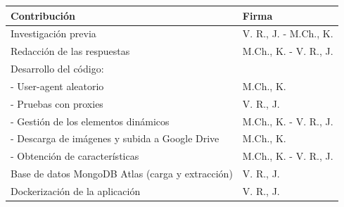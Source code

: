 \noindent
\begin{tabular}{@{}ll@{}}
\toprule
      Contribución& Firma\\ 
\midrule
      Investigación previa & V. R., J. - M.Ch., K.\\
      Redacción de las respuestas & M.Ch., K. - V. R., J. \\
      Desarrollo del código:& \\
      \hspace{3mm}- User-agent aleatorio & M.Ch., K.\\
      \hspace{3mm}- Pruebas con proxies & V. R., J. \\
      \hspace{3mm}- Gestión de los elementos dinámicos & M.Ch., K. - V. R., J. \\
      \hspace{3mm}- Descarga de imágenes y subida a Google Drive & M.Ch., K.\\
      \hspace{3mm}- Obtención de características & M.Ch., K. - V. R., J. \\

      Base de datos MongoDB Atlas (carga y extracción) & V. R., J. \\
      Dockerización de la aplicación & V. R., J. \\
\bottomrule
\end{tabular} 



